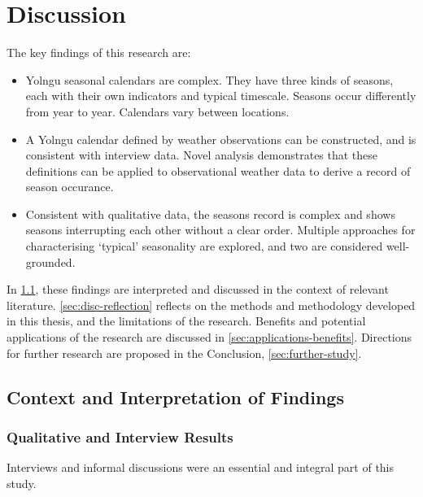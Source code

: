 \chapter{Discussion}
\label{ch:discussion}

The key findings of this research are:
\begin{itemize}
\item Yolngu seasonal calendars are complex.  They have three kinds of
    seasons, each with their own indicators and typical timescale.  Seasons
    occur differently from year to year.  Calendars vary between locations.

\item A Yolngu calendar defined by weather observations can be constructed,
    and is consistent with interview data.  Novel analysis demonstrates that
    these definitions can be applied to observational weather data to derive
    a record of season occurance.

\item Consistent with qualitative data, the seasons record is complex and
    shows seasons interrupting each other without a clear order.  Multiple
    approaches for characterising `typical' seasonality are explored, and
    two are considered well-grounded.
\end{itemize}

In \cref{sec:disc-results}, these findings are interpreted and discussed in
the context of relevant literature.  \cref{sec:disc-reflection} reflects on
the methods and methodology developed in this thesis, and the limitations
of the research.  Benefits and potential applications of the research are
discussed in \cref{sec:applications-benefits}.  Directions for further
research are proposed in the Conclusion, \cref{sec:further-study}.


\section{Context and Interpretation of Findings}
\label{sec:disc-results}

\subsection{Qualitative and Interview Results}

Interviews and informal discussions were an essential and integral part of
this study.

